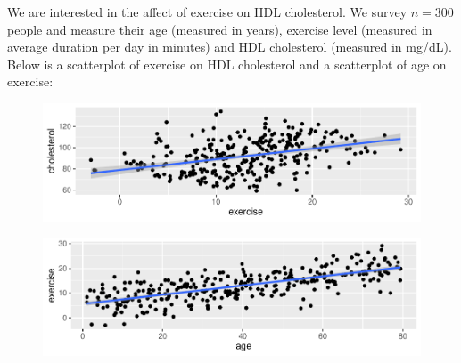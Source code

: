 \documentclass[12pt]{article}
\begin{document}
\problem We are interested in the affect of exercise on HDL cholesterol. We survey $n=300$ people and measure their age (measured in years), exercise level (measured in average duration per day in minutes) and HDL cholesterol (measured in mg/dL). Below is a scatterplot of exercise on HDL cholesterol and a scatterplot of age on exercise:
\pagebreak

\vspace{-0.2cm}
\begin{figure}[htp]
\centering
\includegraphics[width=6.0in]{exercise_cholesterol}
\end{figure}
\FloatBarrier
\vspace{-0.7cm}

\vspace{-0.2cm}
\begin{figure}[htp]
\centering
\includegraphics[width=6.0in]{age_exercise}
\end{figure}
\FloatBarrier
\vspace{-0.7cm}
\end{document}
